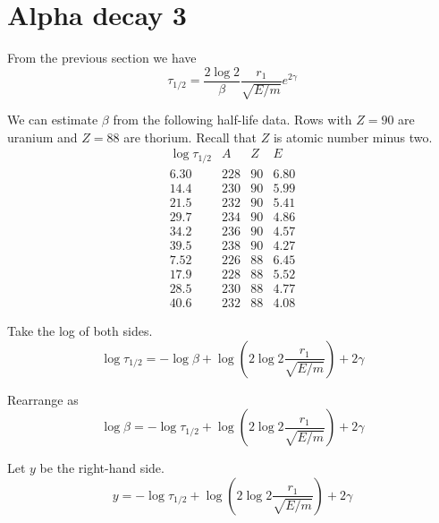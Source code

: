


\section*{Alpha decay 3}

From the previous section we have
\begin{equation*}
\tau_{1/2}=\frac{2\log2}{\beta}\frac{r_1}{\sqrt{E/m}}e^{2\gamma}
\end{equation*}

We can estimate $\beta$ from the following half-life data.
Rows with $Z=90$ are uranium and $Z=88$ are thorium.
Recall that $Z$ is atomic number minus two.
\begin{equation*}
\begin{matrix}
\log\tau_{1/2} & A & Z & E
\\[1ex]
6.30 & 228 & 90 & 6.80
\\
14.4 & 230 & 90 & 5.99
\\
21.5 & 232 & 90 & 5.41
\\
29.7 & 234 & 90 & 4.86
\\
34.2 & 236 & 90 & 4.57
\\
39.5 & 238 & 90 & 4.27
\\
7.52 & 226 & 88 & 6.45
\\
17.9 & 228 & 88 & 5.52
\\
28.5 & 230 & 88 & 4.77
\\
40.6 & 232 & 88 & 4.08
\end{matrix}
\end{equation*}

Take the log of both sides.
\begin{equation*}
\log\tau_{1/2}=-\log\beta+\log\left(2\log2\frac{r_1}{\sqrt{E/m}}\right)+2\gamma
\end{equation*}

Rearrange as
\begin{equation*}
\log\beta=-\log\tau_{1/2}+\log\left(2\log2\frac{r_1}{\sqrt{E/m}}\right)+2\gamma
\end{equation*}

Let $y$ be the right-hand side.
\begin{equation*}
y=-\log\tau_{1/2}+\log\left(2\log2\frac{r_1}{\sqrt{E/m}}\right)+2\gamma
\end{equation*}

